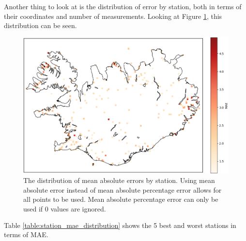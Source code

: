 Another thing to look at is the distribution of error by station, both in terms of their coordinates and number of measurements. Looking at Figure \ref{fig:station_mae_distribution}, this distribution can be seen.

\begin{figure}
    \includegraphics[scale=0.6]{Figures/MAEoverIceland.png}
    \caption[Distribution of mean absolute errors by station]{The distribution of mean absolute errors by station. Using mean absolute error instead of mean absolute percentage error allows for all points to be used. Mean absolute percentage error can only be used if 0 values are ignored.}
    \label{fig:station_mae_distribution}
\end{figure}

Table \ref{table:station_mae_distribution} shows the 5 best and worst stations in terms of MAE.

